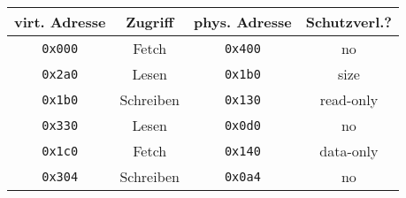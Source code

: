 

\usepackage{wasysym}

\date{Donnerstag 09.07.2020}


    \maketitle
    \thispagestyle{fancy}

    \begin{center}
        \begin{tabular}{|c|c||c|c|}
            \hline 
            virt. Adresse & Zugriff & phys. Adresse & Schutzverl.? \\ \hline
            \texttt{0x000} & Fetch     & \texttt{0x400} & no \\
            \texttt{0x2a0} & Lesen     & \texttt{0x1b0} & size \\
            \texttt{0x1b0} & Schreiben & \texttt{0x130} & read-only \\
            \texttt{0x330} & Lesen     & \texttt{0x0d0} & no \\
            \texttt{0x1c0} & Fetch     & \texttt{0x140} & data-only \\
            \texttt{0x304} & Schreiben & \texttt{0x0a4} & no \\ \hline
        \end{tabular}
    \end{center}





% 
% 
